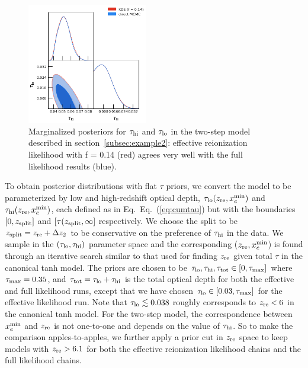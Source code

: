 \documentclass[prd,twocolumn,amsmath,amssymb,floatfix,superscriptaddress,nofootinbib]{revtex4-1}
\newcommand{\refeq}[1]{Eq.~(\ref{eq:#1})}
\newcommand{\refssec}[1]{section~\ref{subsec:#1}}
\newcommand{\zre}{z_{\rm re}}
\newcommand{\xemin}{x_e^{\rm min}}
\newcommand{\tauhi}{\tau_{\rm hi}}
\newcommand{\taulo}{\tau_{\rm lo}}
\begin{document}
\begin{figure}[t]
\includegraphics[width=0.47\textwidth]{results/cosmomc_kde/pl18_tanh_highz_test5_run1_vs_relike_tanh_highz_test8_run9_f0p14_taulo_prior_0p03_zre_prior_6p1_taulo_prior_0p0_tri.png}
\caption{Marginalized posteriors for $\tauhi$ and $\taulo$ in the two-step model described in \refssec{example2}: effective reionization likelihood with f = 0.14 (red) agrees very well with the full likelihood results (blue). 
}
\label{fig:two_parameter_model_2D}
\end{figure}

To obtain posterior distributions with flat $\tau$ priors, we convert the model to be parameterized by low and high-redshift optical depth, $\taulo(\zre, \xemin)$ and $\tauhi(\zre, \xemin)$, 
each defined as in Eq.~\refeq{cumtau} but with the boundaries $[0, z_{\rm split}]$ and $[\tau(z_{\rm split}, \infty]$ respectively. We choose the split to be $z_{\rm split} = \zre + \Delta z_2$ to be conservative on the preference of $\tauhi$ in the data. 
We sample in the $(\taulo, \tauhi)$ parameter space and the corresponding ($\zre, \xemin$) is found through an iterative search similar to that used for finding $\zre$ given total $\tau$ in the canonical tanh model. 
The priors are chosen to be $\taulo, \tauhi, \tau_{\rm tot} \in [0, \tau_{\rm max}]$ where $\tau_{\rm max} = 0.35$, and $\tau_{\rm tot} = \taulo + \tauhi$ is the total optical depth for both the effective and full likelihood runs, 
except that we have chosen $\taulo \in [0.03, \tau_{\rm max}]$ for the effective likelihood run. 
Note that $\taulo \lesssim 0.038$ roughly corresponds to $\zre < 6$ in the canonical tanh model. For the two-step model, the correspondence between $\xemin$ and $\zre$ is not one-to-one and depends on the value of $\tauhi$. 
So to make the comparison apples-to-apples, we further apply a prior cut in $\zre$ space to keep models with $\zre > 6.1$ for both the effective reionization likelihood chains and the full likelihood chains.
\end{document}
